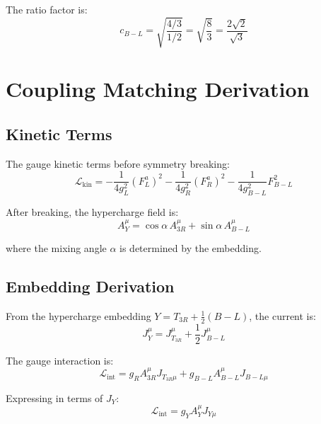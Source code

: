 \documentclass[11pt,a4paper]{article}
\begin{document}
The ratio factor is:
\begin{equation}
\label{eq:normalization-ratio}
c_{B-L} = \sqrt{\frac{4/3}{1/2}} = \sqrt{\frac{8}{3}} = \frac{2\sqrt{2}}{\sqrt{3}}
\end{equation}

\section{Coupling Matching Derivation}
\label{sec:coupling-matching}

\subsection{Kinetic Terms}
\label{subsec:kinetic}

The gauge kinetic terms before symmetry breaking:
\begin{equation}
\label{eq:kinetic-before}
\mathcal{L}_{\text{kin}} = -\frac{1}{4g_L^2} (F_L^a)^2 - \frac{1}{4g_R^2} (F_R^a)^2 - \frac{1}{4g_{B-L}^2} F_{B-L}^2
\end{equation}

After breaking, the hypercharge field is:
\begin{equation}
\label{eq:hypercharge-field}
A_Y^\mu = \cos\alpha \, A_{3R}^\mu + \sin\alpha \, A_{B-L}^\mu
\end{equation}

where the mixing angle $\alpha$ is determined by the embedding.

\subsection{Embedding Derivation}
\label{subsec:embedding-derivation}

From the hypercharge embedding $Y = T_{3R} + \frac{1}{2}(B-L)$, the current is:
\begin{equation}
\label{eq:hypercharge-current}
J_Y^\mu = J_{T_{3R}}^\mu + \frac{1}{2} J_{B-L}^\mu
\end{equation}

The gauge interaction is:
\begin{equation}
\label{eq:gauge-interaction}
\mathcal{L}_{\text{int}} = g_R A_{3R}^\mu J_{T_{3R}\mu} + g_{B-L} A_{B-L}^\mu J_{B-L\mu}
\end{equation}

Expressing in terms of $J_Y$:
\begin{equation}
\label{eq:rewrite-interaction}
\mathcal{L}_{\text{int}} = g_Y A_Y^\mu J_{Y\mu}
\end{equation}
\end{document}

